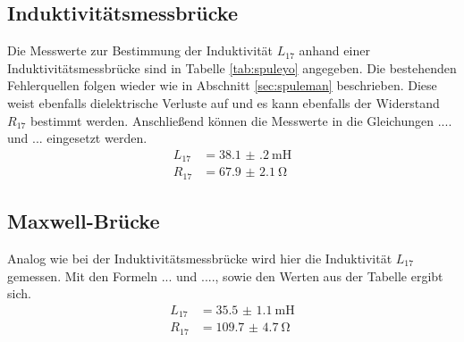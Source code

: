 \subsection{Induktivitätsmessbrücke}
Die Messwerte zur Bestimmung der Induktivität $L_{17}$ anhand einer Induktivitätsmessbrücke sind in Tabelle \ref{tab:spuleyo} angegeben. Die bestehenden Fehlerquellen
folgen wieder wie in Abschnitt \ref{sec:spuleman} beschrieben. Diese weist ebenfalls dielektrische Verluste 
auf und es kann ebenfalls der Widerstand $R_{17}$ bestimmt werden. Anschließend können die Messwerte in die Gleichungen .... und ... eingesetzt werden.
\begin{align}
L_{17} &= \SI{38.1(2)}{\milli\henry} \\
R_{17} &= \SI{67.9(21)}{\ohm} 
\end{align}

\subsection{Maxwell-Brücke}
Analog wie bei der Induktivitätsmessbrücke wird hier die Induktivität $L_{17}$ gemessen. Mit den Formeln ... und ...., sowie den Werten aus der Tabelle ergibt sich.
\begin{align}
    L_{17} &= \SI{35.5(11)}{\milli\henry} \\
    R_{17} &= \SI{109.7(47)}{\ohm} 
\end{align}